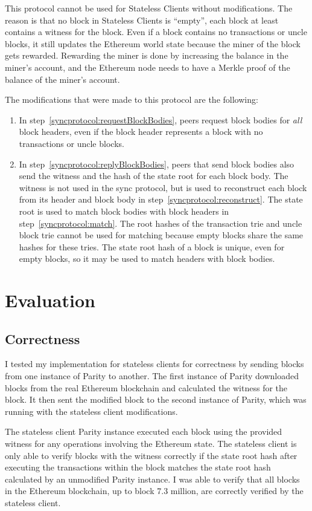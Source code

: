 \documentclass[12pt]{article}
\newcounter{protocol}
\begin{document}
This protocol cannot be used for Stateless Clients without modifications. The reason is that no block in Stateless Clients is ``empty'', each block at least contains a witness for the block. Even if a block contains no transactions or uncle blocks, it still updates the Ethereum world state because the miner of the block gets rewarded. Rewarding the miner is done by increasing the balance in the miner's account, and the Ethereum node needs to have a Merkle proof of the balance of the miner's account.

The modifications that were made to this protocol are the following:
\begin{enumerate}
  \item In step~\ref{syncprotocol:requestBlockBodies}, peers request block bodies for \emph{all} block headers, even if the block header represents a block with no transactions or uncle blocks.
  \item In step~\ref{syncprotocol:replyBlockBodies}, peers that send block bodies also send the witness and the hash of the state root for each block body. The witness is not used in the sync protocol, but is used to reconstruct each block from its header and block body in step~\ref{syncprotocol:reconstruct}. The state root is used to match block bodies with block headers in step~\ref{syncprotocol:match}. The root hashes of the transaction trie and uncle block trie cannot be used for matching because empty blocks share the same hashes for these tries. The state root hash of a block is unique, even for empty blocks, so it may be used to match headers with block bodies.
\end{enumerate}


\section{Evaluation}

\subsection{Correctness}

I tested my implementation for stateless clients for correctness by sending blocks from one instance of Parity to another. The first instance of Parity downloaded blocks from the real Ethereum blockchain and calculated the witness for the block. It then sent the modified block to the second instance of Parity, which was running with the stateless client modifications.

The stateless client Parity instance executed each block using the provided witness for any operations involving the Ethereum state. The stateless client is only able to verify blocks with the witness correctly if the state root hash after executing the transactions within the block matches the state root hash calculated by an unmodified Parity instance. I was able to verify that all blocks in the Ethereum blockchain, up to block 7.3 million, are correctly verified by the stateless client.
\end{document}
